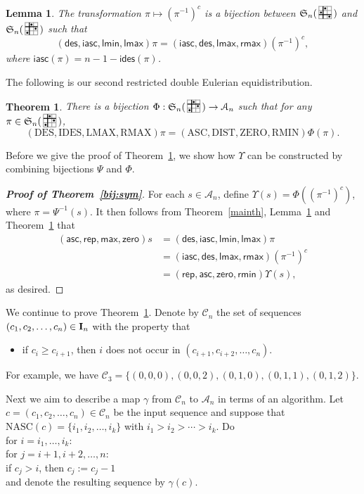 \documentclass[12pt]{amsart}
\newcounter{mycount}
\theoremstyle{plain}
\newtheorem{theorem}[mycount]{Theorem}
\newtheorem{lemma}[mycount]{Lemma}
\theoremstyle{definition}
\theoremstyle{example}
\theoremstyle{remark}
\numberwithin{equation}{section}
\numberwithin{figure}{section}
\newcommand\des{\mathop{\rm des}}
\def\des{\mathsf{des}}
\def\ides{\mathsf{ides}}
\def\iasc{\mathsf{iasc}}
\newcommand{\asc}{\mathsf{asc}}
\def\max{\mathsf{max}}
\def\zero{\mathsf{zero}}
\def\rep{\mathsf{rep}}
\def\rmin{\mathsf{rmin}}
\def\lmax{\mathsf{lmax}}
\def\lmin{\mathsf{lmin}}
\def\rmax{\mathsf{rmax}}
\def\A{\mathcal{A}}
\def\I{\operatorname{{\bf I}}}
\def\IDES{\mathrm{IDES}}
\def\DES{\mathrm{DES}}
\def\RMAX{\mathrm{RMAX}}
\def\LMAX{\mathrm{LMAX}}
\def\DIST{\mathrm{DIST}}
\def\ASC{\mathrm{ASC}}
\def\RMIN{\mathrm{RMIN}}
\def\ZERO{\mathrm{ZERO}}
\def\NASC{\mathrm{NASC}}
\def\S{\mathfrak{S}}
\newcommand{\PATTERN}{
    \draw[step=1, xshift=14pt, yshift=14pt, \cfill, line cap=round] (0,0) grid (3,3);
    \draw[step=1, xshift=14pt, yshift=14pt, thick] (0,2) -- (3,2);
    \draw[step=1, xshift=14pt, yshift=14pt, thick] (1,0) -- (1,3);
    \foreach \x/\y in {1/1,2/3,3/2} \node[disc, fill=black] at (\x,\y) {};
}
\newcommand{\SEPATTERN}{
    \draw[step=1, xshift=14pt, yshift=14pt, \cfill, line cap=round] (0,0) grid (3,3);
    \draw[step=1, xshift=14pt, yshift=14pt, thick] (0,1) -- (3,1);
    \draw[step=1, xshift=14pt, yshift=14pt, thick] (1,0) -- (1,3);
    \foreach \x/\y in {1/2,2/3,3/1} \node[disc, fill=black] at (\x,\y) {};
}
\newcommand{\pattern}{\!\raisebox{-0.3em}{
  \begin{tikzpicture}[line width=0.7pt, scale=0.15]
    \tikzstyle{disc} = [circle,thin,draw=black, minimum size=1.7pt, inner sep=0pt ]
    \PATTERN
  \end{tikzpicture}}
}
\newcommand{\sepattern}{\!\raisebox{-0.3em}{
  \begin{tikzpicture}[line width=0.7pt, scale=0.15]
    \tikzstyle{disc} = [circle,thin,draw=black, minimum size=1.7pt, inner sep=0pt ]
    \SEPATTERN
  \end{tikzpicture}}
}
\newcommand{\cfill}{black!40}
\begin{document}
 \begin{lemma}\label{lem1}
 The transformation $\pi\mapsto(\pi^{-1})^{c}$ is a bijection between $\S_n(\sepattern\,)$ and $\S_n(\pattern\,)$ such that
 $$
 (\des, \iasc, \lmin, \lmax) \pi= (\iasc, \des, \lmax, \rmax)(\pi^{-1})^{c},
 $$
 where $\iasc(\pi)=n-1-\ides(\pi)$.
 \end{lemma}


The following is our second restricted double Eulerian equidistribution.
\begin{theorem}\label{mainth3}
There  is a bijection $\Phi: \S_n(\pattern\,)\rightarrow\mathcal{A}_n$  such  that  for any $\pi\in  \S_n(\pattern\,)$,
 $$
 (\DES, \IDES,   \LMAX, \RMAX)\pi=(\ASC, \DIST, \ZERO, \RMIN)\Phi(\pi).
 $$
 \end{theorem}



Before we give the proof of Theorem~\ref{mainth3}, we show how $\Upsilon$ can be constructed by combining bijections $\Psi$ and $\Phi$.
\begin{proof}[{\bf Proof of Theorem~\ref{bij:sym}}]
For each $s\in\A_n$, define $\Upsilon(s)=\Phi((\pi^{-1})^c)$, where $\pi=\Psi^{-1}(s)$. It then follows from Theorem~\ref{mainth}, Lemma~\ref{lem1} and Theorem~\ref{mainth3} that
\begin{align*}
(\asc,\rep,\max,\zero)s&= (\des,\iasc,\lmin,\lmax)\pi\\
&=(\iasc, \des, \lmax, \rmax)(\pi^{-1})^{c}\\
&=(\rep,\asc,\zero,\rmin)\Upsilon(s),
\end{align*}
as desired.
\end{proof}



We continue to prove Theorem~\ref{mainth3}.  Denote by $\mathcal{C}_n$ the set of sequences $(c_1,c_2,\ldots, c_n)\in\I_n$ with the  property that
\begin{itemize}
\item[(c)]  if $c_{i}\geq c_{i+1}$, then $i$ does not occur in  $(c_{i+1},c_{i+2},\ldots, c_{n})$.
\end{itemize}
For example, we have $\mathcal{C}_3=\{(0,0,0),(0,0,2),(0,1,0),(0,1,1),(0,1,2)\}$.


Next we aim to describe a map $\gamma$ from $\mathcal{C}_n$ to $\mathcal{A}_n$ in   terms of an algorithm.   Let $c=(c_1,c_2,\ldots, c_n)\in\mathcal{C}_n$ be the input sequence and suppose that $\NASC(c)=\{i_1, i_2, \ldots , i_k\}$ with $i_1>i_2>\cdots > i_k$. Do \\
\hspace*{0.5cm}  for $i=i_1,\ldots, i_k$:\\
\hspace*{1cm}  for $j=i+1, i+2, \ldots, n$:\\
 \hspace*{1.5cm}  if  $c_j>i$, then $c_j:=c_j-1$\\
and denote the resulting sequence by $\gamma(c)$.
\end{document}
